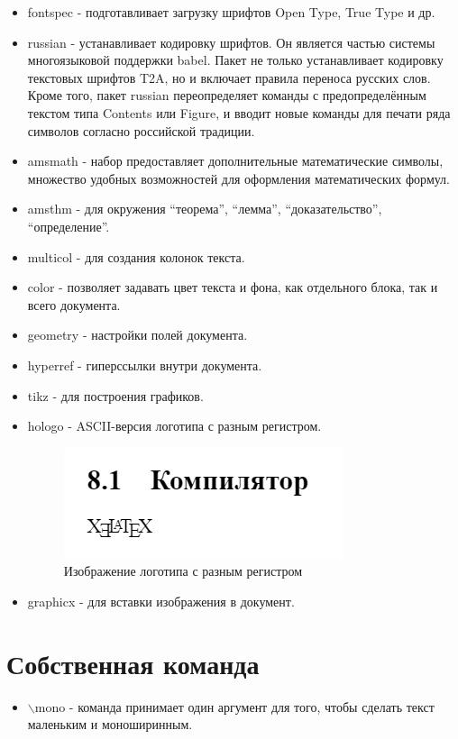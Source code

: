 \documentclass[a4paper,12pt]{report}
\begin{document}
\begin{itemize}
\item \textcolor{mypink}{fontspec} - подготавливает загрузку шрифтов Open Type, True Type и др.
\item \textcolor{mypink}{russian}  - устанавливает кодировку шрифтов. Он является частью системы многоязыковой поддержки babel. Пакет не только устанавливает кодировку текстовых шрифтов T2A, но и включает правила переноса русских слов. Кроме того, пакет russian переопределяет команды с предопределённым текстом типа Contents или Figure, и вводит новые команды для печати ряда символов согласно российской традиции.
\item \textcolor{mypink}{amsmath} - набор предоставляет дополнительные математические символы, множество удобных возможностей для оформления математических формул.
\item \textcolor{mypink}{amsthm} - для окружения ``теорема'', ``лемма'', ``доказательство'', ``определение''.
\item \textcolor{mypink}{multicol} - для создания колонок текста.
\item \textcolor{mypink}{color} - позволяет задавать цвет текста и фона, как отдельного блока, так и всего документа.
\item \textcolor{mypink}{geometry} - настройки полей документа.
\item \textcolor{mypink}{hyperref} - гиперссылки внутри документа.
\item \textcolor{mypink}{tikz} - для построения графиков.
\item \textcolor{mypink}{hologo} - ASCII-версия логотипа с разным регистром.

\begin{figure}[ht]
\centering
\includegraphics{logo.png}
\caption{Изображение логотипа с разным регистром}
\end{figure}

\item \textcolor{mypink}{graphicx} - для вставки изображения в документ.
\end{itemize}

\section{Собственная команда}

\begin{itemize}
\item $\backslash$mono - команда принимает один аргумент для того, чтобы сделать текст маленьким и моноширинным.
\end{itemize}
\end{document}
